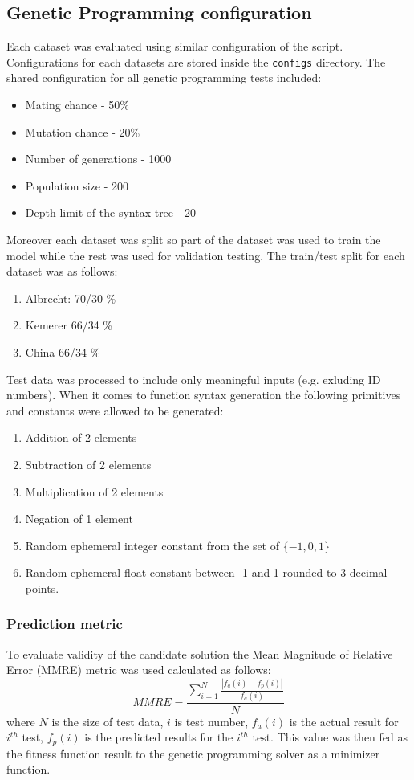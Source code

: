 \documentclass[12pt]{article}
\begin{document}
\subsection{Genetic Programming configuration}
Each dataset was evaluated using similar configuration of the script. Configurations for each datasets are stored inside the \texttt{configs} directory. The shared configuration for all genetic programming tests included:
\begin{itemize}
  \item Mating chance - 50\%
  \item Mutation chance - 20\%
  \item Number of generations - 1000
  \item Population size - 200
  \item Depth limit of the syntax tree - 20
\end{itemize}
Moreover each dataset was split so part of the dataset was used to train the model while the rest was used for validation testing. The train/test split for each dataset was as follows:
\begin{enumerate}
  \item Albrecht: 70/30 \%
  \item Kemerer 66/34 \%
  \item China 66/34 \%
\end{enumerate}
Test data was processed to include only meaningful inputs (e.g. exluding ID numbers).
When it comes to function syntax generation the following primitives and constants were allowed to be generated:
\begin{enumerate}
  \item Addition of 2 elements
  \item Subtraction of 2 elements
  \item Multiplication of 2 elements
  \item Negation of 1 element
  \item Random ephemeral integer constant from the set of $\{-1, 0, 1\}$
  \item Random ephemeral float constant between -1 and 1 rounded to 3 decimal points.
\end{enumerate}
\subsubsection{Prediction metric}
To evaluate validity of the candidate solution the Mean Magnitude of Relative Error (MMRE) metric was used calculated as follows:
\begin{equation}
  MMRE=\frac{\sum\limits_{i=1}^N \frac{|f_a(i) - f_p(i)|}{f_a(i)}}{N}
\end{equation}
where $N$ is the size of test data, $i$ is test number, $f_a(i)$ is the actual result for $i^{th}$ test, $f_p(i)$ is the predicted results for the $i^{th}$ test. This value was then fed as the fitness function result to the genetic programming solver as a minimizer function.
\end{document}
